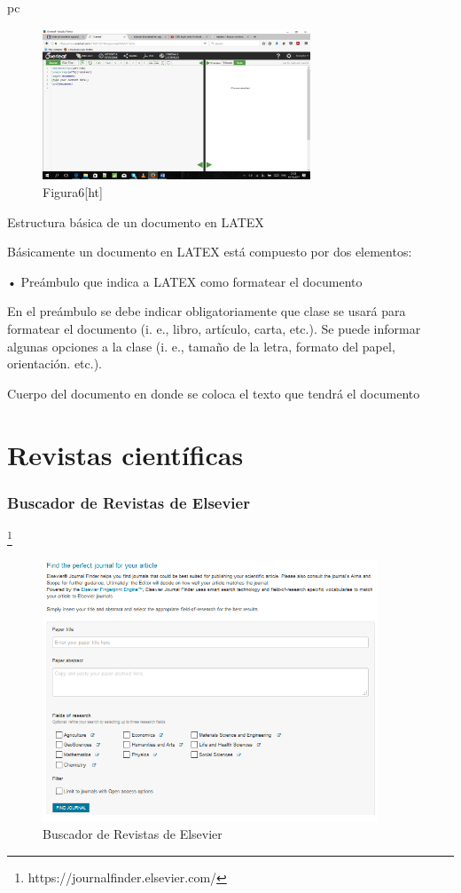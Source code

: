 pc\documentclass[a4paper,12pt,openany]{book}
\begin{document}
\begin{itemize}
\begin{figure}[ht]
  \centering
	\includegraphics[width=8cm]{7.png}
\caption{Figura6[ht]}
  \label{fig:ejemplo}
\end{figure}

Estructura básica de un documento en LATEX

Básicamente un documento en LATEX está compuesto por dos elementos:

•	Preámbulo que indica a LATEX como formatear el documento

En el preámbulo se debe indicar obligatoriamente que clase se usará para formatear el documento (i. e., libro, artículo, carta, etc.).
Se puede informar algunas opciones a la clase (i. e., tamaño de la letra, formato del papel, orientación. etc.).

Cuerpo del documento en donde se coloca el texto que tendrá el documento
\chapter{Revistas científicas}

\subsection{Buscador de Revistas de Elsevier}

\footnote{https://journalfinder.elsevier.com/}

\begin{figure}[ht]
  \centering
	\includegraphics[width=10cm]{Elsevier1.png}
\caption{Buscador de Revistas de Elsevier}
  \label{fig:Elsevier1}
\end{figure}


\end{itemize}
\end{document}
